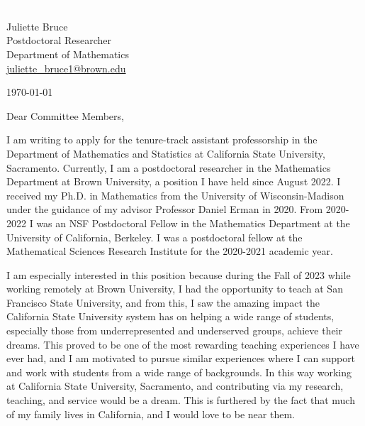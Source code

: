 \documentclass[11pt]{article}
\begin{document}
\section*{}

\noindent
\begin{minipage}{0.99\textwidth}
\begin{minipage}{0.69\textwidth}
\textcolor{white}{.}
\end{minipage}
\begin{minipage}{0.29\textwidth}
{
Juliette Bruce \\
Postdoctoral Researcher \\
Department of Mathematics \\
\href{mailto:juliette\_bruce1@brown.edu}{juliette\_bruce1@brown.edu}
}

\vspace{12pt}
\today
\end{minipage}
\end{minipage}


\vspace{12pt}
\noindent
Dear Committee Members,

I am writing to apply for the tenure-track assistant professorship in the Department of Mathematics and Statistics at California State University, Sacramento. Currently, I am a postdoctoral researcher in the Mathematics Department at Brown University, a position I have held since August 2022. I received my Ph.D. in Mathematics from the University of Wisconsin-Madison under the guidance of my advisor Professor Daniel Erman in 2020. From 2020-2022 I was an NSF Postdoctoral Fellow in the Mathematics Department at the University of California, Berkeley. I was a postdoctoral fellow at the Mathematical Sciences Research Institute for the 2020-2021 academic year.

I am especially interested in this position because during the Fall of 2023 while working remotely at Brown University, I had the opportunity to teach at San Francisco State University, and from this, I saw the amazing impact the California State University system has on helping a wide range of students, especially those from underrepresented and underserved groups, achieve their dreams. This proved to be one of the most rewarding teaching experiences I have ever had, and I am motivated to pursue similar experiences where I can support and work with students from a wide range of backgrounds.  In this way working at California State University, Sacramento, and contributing via my research, teaching, and service would be a dream. This is furthered by the fact that much of my family lives in California, and I would love to be near them. 
\end{document}
